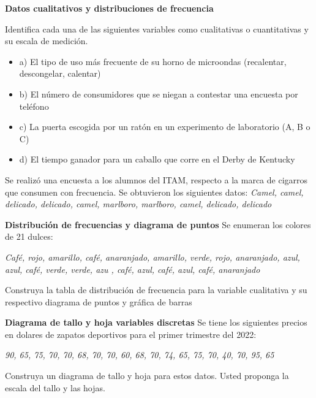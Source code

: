 \documentclass{../oxmathproblems}
\begin{document}
\begin{questions}

\miquestion \textbf{Datos cualitativos y distribuciones de frecuencia}

Identifica cada una de las siguientes variables como cualitativas o cuantitativas y su escala de medición. 
\begin{itemize}

\item a) El tipo de uso más frecuente de su horno de microondas (recalentar, descongelar, calentar)

\item b) El número de consumidores que se niegan a contestar una encuesta por teléfono 

\item c) La puerta escogida por un ratón en un experimento de laboratorio (A, B o C)

\item d) El tiempo ganador para un caballo que corre en el Derby de Kentucky 

\end{itemize}




\miquestion Se realizó una encuesta a los alumnos del ITAM, respecto a la marca de cigarros que consumen con frecuencia. Se obtuvieron los siguientes datos: 
\textit{Camel, camel, delicado, delicado, camel, marlboro, marlboro, camel, delicado, delicado}







\miquestion \textbf{Distribución de frecuencias y diagrama de puntos}
Se enumeran los colores de 21 dulces: 

\textit{Café, rojo, amarillo, café, anaranjado, amarillo, verde, rojo, anaranjado, azul, azul, café, verde, verde, azu , café, azul, café, azul, café, anaranjado}

Construya la tabla de distribución de frecuencia para la variable cualitativa y su respectivo diagrama de puntos y gráfica de barras

\miquestion \textbf{Diagrama de tallo y hoja variables discretas}
Se tiene los siguientes precios en dolares de zapatos deportivos para el primer trimestre del 2022:

\textit{90, 65, 75, 70, 70, 68, 70, 70, 60, 68, 70, 74, 65, 75, 70, 40, 70, 95, 65}

Construya un diagrama de tallo y hoja para estos datos. Usted proponga la escala del tallo y las hojas.


\end{questions}
\end{document}
